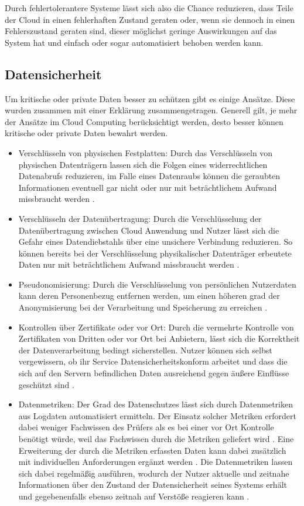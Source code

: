 Durch fehlertolerantere Systeme lässt sich also die Chance reduzieren, dass Teile der Cloud in einen fehlerhaften Zustand geraten oder, wenn sie dennoch in einen Fehlerszustand geraten sind, dieser möglichst geringe Auswirkungen auf das System hat und einfach oder sogar automatisiert behoben werden kann.

\subsection{Datensicherheit} 
Um kritische oder private Daten besser zu schützen gibt es einige Ansätze. Diese wurden zusammen mit einer Erklärung zusammengetragen. Generell gilt, je mehr der Ansätze im Cloud Computing berücksichtigt werden, desto besser können kritische oder private Daten bewahrt werden.
\begin{itemize}
\item
Verschlüsseln von physischen Festplatten: Durch das Verschlüsseln von physischen Datenträgern lassen sich die Folgen eines widerrechtlichen Datenabrufs reduzieren, im Falle eines Datenraubs können die geraubten Informationen eventuell gar nicht oder nur mit beträchtlichem Aufwand missbraucht werden \cite{selzer2020}.
\item
Verschlüsseln der Datenübertragung: Durch die Verschlüsselung der Datenübertragung zwischen Cloud Anwendung und Nutzer lässt sich die Gefahr eines Datendiebstahls über eine unsichere Verbindung reduzieren. So können bereits bei der Verschlüsselung physikalischer Datenträger erbeutete Daten nur mit beträchtlichem Aufwand missbraucht werden \cite{selzer2020}.
\item
Pseudonomisierung: Durch die Verschlüsselung von persönlichen Nutzerdaten kann deren  Personenbezug entfernen werden, um einen höheren grad der Anonymisierung bei der Verarbeitung und Speicherung zu erreichen \cite{selzer2020}.
\item
Kontrollen über Zertifikate oder vor Ort: Durch die vermehrte Kontrolle von Zertifikaten von Dritten oder vor Ort bei Anbietern, lässt sich die Korrektheit der Datenverarbeitung bedingt sicherstellen. Nutzer können sich selbst vergewissern, ob ihr Service Datensicherheitskonform arbeitet und dass die sich auf den Servern befindlichen Daten ausreichend gegen äußere Einflüsse geschützt sind \cite{selzer2020}. 
\item 
Datenmetriken: Der Grad des Datenschutzes lässt sich durch Datenmetriken aus Logdaten automatisiert ermitteln. Der Einsatz solcher Metriken erfordert dabei weniger Fachwissen des Prüfers als es bei einer vor Ort Kontrolle benötigt würde, weil das Fachwissen durch die Metriken geliefert wird \cite{selzer2020}. Eine Erweiterung der durch die Metriken erfassten Daten kann dabei zusätzlich mit individuellen Anforderungen ergänzt werden \cite{selzer2020}. Die Datenmetriken lassen sich dabei regelmäßig ausführen, wodurch der Nutzer aktuelle und zeitnahe Informationen über den Zustand der Datensicherheit seines Systems erhält und gegebenenfalls ebenso zeitnah auf Verstöße reagieren kann \cite{selzer2020}.

\end{itemize}
